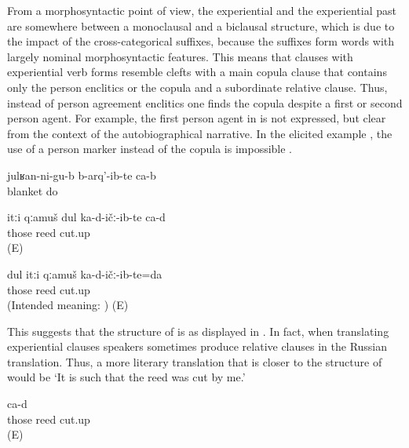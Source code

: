 From a morphosyntactic point of view, the experiential and the experiential past are somewhere between a monoclausal and a biclausal structure, which is due to the impact of the cross-categorical suffixes, because the suffixes form words with largely nominal morphosyntactic features. This means that clauses with experiential verb forms resemble clefts with a main copula clause that contains only the person enclitics or the copula and a subordinate relative clause. Thus, instead of person agreement enclitics one finds the copula despite a first or second person agent. For example, the first person agent in  is not expressed, but clear from the context of the autobiographical narrative. In the elicited example , the use of a person marker instead of the copula is impossible .
%
\begin{exe}
	\ex	\label{ex:‎(I) gave birth to (my children) under a blanket analytic}
	\gll	julʁan-ni-gu-b	b-arq'-ib-te	ca-b\\
		blanket	do 	\\
	\glt	{}
\end{exe}

\begin{exe}
\ex
\begin{xlist}
	\ex	\label{ex:I cut that reed analytic}
	\gll	itːi	qːamuš	dul	ka-d-ičː-ib-te	ca-d\\
		those	reed		cut.up	\\
	\glt	{} (E)
	
		\ex	\label{Intended meaningI cut that reed.}
	\gll * dul itːi	qːamuš	ka-d-ičː-ib-te=da\\
	{}  those	reed cut.up \\
	\glt	{} (Intended meaning: ) (E)
\end{xlist}
\end{exe}

This suggests that the structure of  is as displayed in . In fact, when translating experiential clauses speakers sometimes produce relative clauses in the Russian translation. Thus, a more literary translation that is closer to the structure of  would be `It is such that the reed was cut by me.' 
%
\begin{exe}
	\ex	\label{ex:I cut that reed Russian relative clause analytic}
		ca-d\\
		those	reed		cut.up	\\
	\glt	{} (E)
	

\end{exe}

